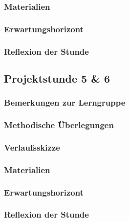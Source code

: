 \subsubsection{Materialien}
\subsubsection{Erwartungshorizont}
\subsubsection{Reflexion der Stunde}
\newpage
\subsection{Projektstunde 5 \& 6}\steffen
\subsubsection{Bemerkungen zur Lerngruppe}
\subsubsection{Methodische Überlegungen}
\subsubsection{Verlaufsskizze}
\subsubsection{Materialien}
\subsubsection{Erwartungshorizont}
\subsubsection{Reflexion der Stunde}